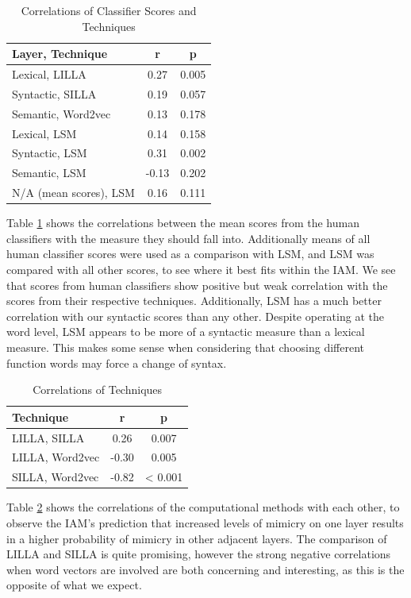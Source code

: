 \documentclass[conference]{IEEEtran}
\begin{document}
\begin{table}[!t]
\caption{Correlations of Classifier Scores and Techniques}
\label{scores_techniques}
\centering
\renewcommand{\arraystretch}{1.2}
\begin{tabular}{l c c}
Layer, Technique & r & p \\
\hline
Lexical, LILLA & 0.27 & 0.005 \\
Syntactic, SILLA & 0.19 & 0.057 \\
Semantic, Word2vec & 0.13 & 0.178 \\
Lexical, LSM & 0.14 & 0.158 \\
Syntactic, LSM & 0.31 & 0.002 \\
Semantic, LSM & -0.13 & 0.202 \\
N/A (mean scores), LSM & 0.16 & 0.111
\end{tabular}
\end{table}

Table \ref{scores_techniques} shows the correlations between the mean scores from the human classifiers with the measure they should fall into.  Additionally means of all human classifier scores were used as a comparison with LSM, and LSM was compared with all other scores, to see where it best fits within the IAM. We see that scores from human classifiers show positive but weak correlation with the scores from their respective techniques. Additionally, LSM has a much better correlation with our syntactic scores than any other. Despite operating at the word level, LSM appears to be more of a syntactic measure than a lexical measure. This makes some sense when considering that choosing different function words may force a change of syntax.

\begin{table}[!t]
\caption{Correlations of Techniques}
\label{techniques}
\centering
\renewcommand{\arraystretch}{1.2}
\begin{tabular}{l c c}
Technique & r & p \\
\hline
LILLA, SILLA & 0.26 & 0.007 \\
LILLA, Word2vec & -0.30 & 0.005 \\
SILLA, Word2vec & -0.82 & < 0.001
\end{tabular}
\end{table}

Table \ref{techniques} shows the correlations of the computational methods with each other, to observe the IAM's prediction that increased levels of mimicry on one layer results in a higher probability of mimicry in other adjacent layers. The comparison of LILLA and SILLA is quite promising, however the strong negative correlations when word vectors are involved are both concerning and interesting, as this is the opposite of what we expect.
\end{document}
